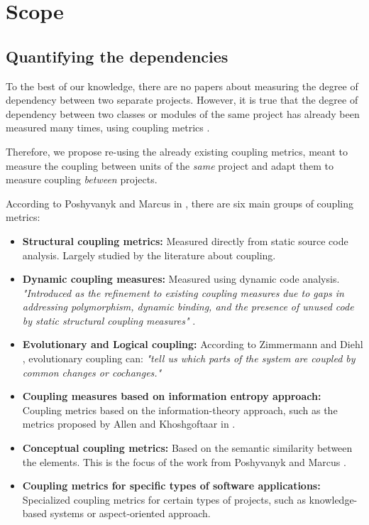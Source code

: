 \section{Scope}\label{section:scope} %

\subsection{Quantifying the dependencies}
To the best of our knowledge, there are no papers about measuring the degree of dependency between two separate projects. However, it is true that the degree of dependency between two classes or modules of the same project has already been measured many times, using coupling metrics \cite{briand1999unified}.

Therefore, we propose re-using the already existing coupling metrics, meant to measure the coupling between units of the \textit{same} project and adapt them to measure coupling \textit{between} projects.

\blankl
According to Poshyvanyk and Marcus in \cite{poshyvanyk2006conceptual}, there are six main groups of coupling metrics:

\begin{itemize}
  \item \textbf{Structural coupling metrics:} Measured directly from static source code analysis. Largely studied by the literature about coupling.

  \item \textbf{Dynamic coupling measures:} Measured using dynamic code analysis. \textit{"Introduced as the refinement to existing coupling measures due to gaps in addressing polymorphism, dynamic binding, and the presence of unused code by static structural coupling measures"} \cite{poshyvanyk2006conceptual}.

  \item \textbf{Evolutionary and Logical coupling:} According to Zimmermann and Diehl \cite{zimmermann2005mining}, evolutionary coupling can: \textit{"tell us which parts of the system are coupled by common changes or cochanges."}

  \item \textbf{Coupling measures based on information entropy approach:} Coupling metrics based on the information-theory approach, such as the metrics proposed by Allen and Khoshgoftaar in \cite{allen1999measuring}.

  \item \textbf{Conceptual coupling metrics:} Based on the semantic similarity between the elements. This is the focus of the work from Poshyvanyk and Marcus \cite{poshyvanyk2006conceptual}.

  \item \textbf{Coupling metrics for specific types of software applications:} Specialized coupling metrics for certain types of projects, such as knowledge-based systems or aspect-oriented approach.
\end{itemize}

